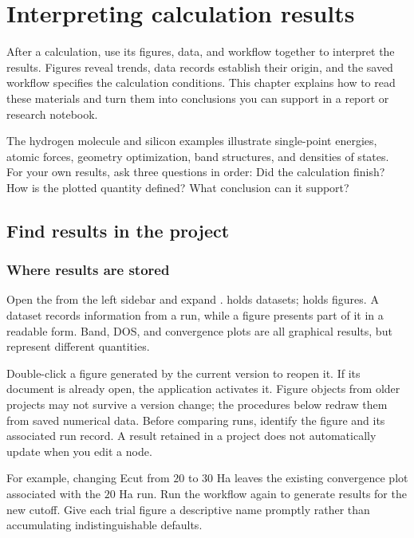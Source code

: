 \chapter{Interpreting calculation results}\label{ch:results}

After a calculation, use its figures, data, and workflow together to interpret the results. Figures reveal trends, data records establish their origin, and the saved workflow specifies the calculation conditions. This chapter explains how to read these materials and turn them into conclusions you can support in a report or research notebook.

The hydrogen molecule and silicon examples illustrate single-point energies, atomic forces, geometry optimization, band structures, and densities of states. For your own results, ask three questions in order: Did the calculation finish? How is the plotted quantity defined? What conclusion can it support?

\section{Find results in the project}

\subsection{Where results are stored}

Open the  from the left sidebar and expand .  holds datasets;  holds figures. A dataset records information from a run, while a figure presents part of it in a readable form. Band, DOS, and convergence plots are all graphical results, but represent different quantities.

Double-click a figure generated by the current version to reopen it. If its document is already open, the application activates it. Figure objects from older projects may not survive a version change; the procedures below redraw them from saved numerical data. Before comparing runs, identify the figure and its associated run record. A result retained in a project does not automatically update when you edit a node.

For example, changing Ecut from $20$ to $30$ Ha leaves the existing convergence plot associated with the $20$ Ha run. Run the workflow again to generate results for the new cutoff. Give each trial figure a descriptive name promptly rather than accumulating indistinguishable defaults.

